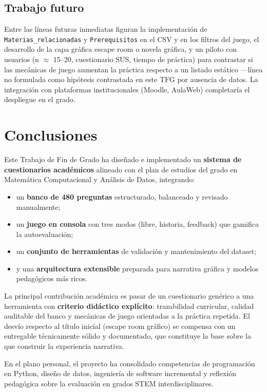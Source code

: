 \documentclass[11pt,a4paper]{article}
\begin{document}
\subsection{Trabajo futuro}

Entre las líneas futuras inmediatas figuran la implementación de \texttt{Materias\_relacionadas} y \texttt{Prerequisitos} en el CSV y en los filtros del juego, el desarrollo de la capa gráfica escape room o novela gráfica, y un piloto con usuarios (n $\approx$ 15--20, cuestionario SUS, tiempo de práctica) para contrastar si las mecánicas de juego aumentan la práctica respecto a un listado estático ---línea no formulada como hipótesis contrastada en este TFG por ausencia de datos. La integración con plataformas institucionales (Moodle, AulaWeb) completaría el despliegue en el grado.

\section{Conclusiones}

Este Trabajo de Fin de Grado ha diseñado e implementado un \textbf{sistema de cuestionarios académicos} alineado con el plan de estudios del grado en Matemática Computacional y Análisis de Datos, integrando:
\begin{itemize}
  \item un \textbf{banco de 480 preguntas} estructurado, balanceado y revisado manualmente;
  \item un \textbf{juego en consola} con tres modos (libre, historia, feedback) que gamifica la autoevaluación;
  \item un \textbf{conjunto de herramientas} de validación y mantenimiento del dataset;
  \item y una \textbf{arquitectura extensible} preparada para narrativa gráfica y modelos pedagógicos más ricos.
\end{itemize}

La principal contribución académica es pasar de un cuestionario genérico a una herramienta con \textbf{criterio didáctico explícito}: trazabilidad curricular, calidad auditable del banco y mecánicas de juego orientadas a la práctica repetida. El desvío respecto al título inicial (escape room gráfico) se compensa con un entregable técnicamente sólido y documentado, que constituye la base sobre la que construir la experiencia narrativa.

En el plano personal, el proyecto ha consolidado competencias de programación en Python, diseño de datos, ingeniería de software incremental y reflexión pedagógica sobre la evaluación en grados STEM interdisciplinares.
\end{document}
